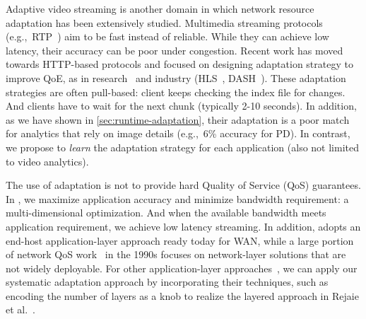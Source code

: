 \documentclass[thesis.tex]{subfiles}
\begin{document}
Adaptive video streaming is another domain in which network resource adaptation
has been extensively studied. Multimedia streaming protocols
(e.g.,~RTP~\cite{schulzrinne2006rtp}) aim to be fast instead of reliable. While
they can achieve low latency, their accuracy can be poor under congestion.
Recent work has moved towards HTTP-based protocols and focused on designing
adaptation strategy to improve QoE, as in research~\cite{mao2017neural,
  sun2016cs2p, yin2015control} and industry (HLS~\cite{pantos2016http},
DASH~\cite{michalos2012dynamic, sodagar2011mpeg}). These adaptation strategies
are often pull-based: client keeps checking the index file for changes. And
clients have to wait for the next chunk (typically 2-10 seconds). In addition,
as we have shown in \autoref{sec:runtime-adaptation}, their adaptation is a poor
match for analytics that rely on image details (e.g.,~6\% accuracy for PD). In
contrast, we propose to \emph{learn} the adaptation strategy for each
application (also not limited to video analytics).

The use of adaptation is not to provide hard Quality of Service (QoS)
guarantees. In \awstream{}, we maximize application accuracy and minimize
bandwidth requirement: a multi-dimensional optimization. And when the available
bandwidth meets application requirement, we achieve low latency streaming.  In
addition, \awstream{} adopts an end-host application-layer approach ready today
for WAN, while a large portion of network QoS work~\cite{ferrari1990scheme,
  shenker1994integrated, shenker1995fundamental} in the 1990s focuses on
network-layer solutions that are not widely deployable. For other
application-layer approaches~\cite{vandalore2001survey}, we can apply our
systematic adaptation approach by incorporating their techniques, such as
encoding the number of layers as a knob to realize the layered approach in
Rejaie et al.~\cite{rejaie2000layered}.


\end{document}
